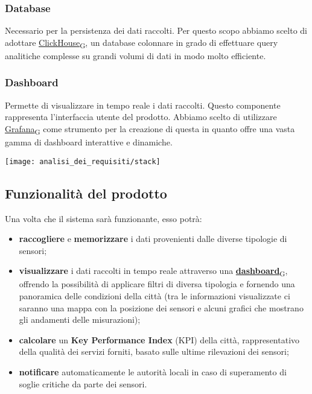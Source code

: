 	\subsubsection*{Database}
	Necessario per la persistenza dei dati raccolti. Per questo scopo abbiamo scelto di adottare \href{https://7last.github.io/docs/rtb/documentazione-interna/glossario\#clickhouse}{ClickHouse\textsubscript{G}}, un database colonnare in grado di effettuare query analitiche complesse su grandi volumi di dati in modo molto efficiente.
	\subsubsection*{Dashboard}
	Permette di visualizzare in tempo reale i dati raccolti. Questo componente rappresenta l'interfaccia utente del prodotto. Abbiamo scelto di utilizzare \href{https://7last.github.io/docs/rtb/documentazione-interna/glossario\#grafana}{Grafana\textsubscript{G}} come strumento per la creazione di questa in quanto offre una vasta gamma di dashboard interattive e dinamiche.


\begin{center}
	\texttt{[image: analisi\_dei\_requisiti/stack]}
\end{center}

\subsection{Funzionalità del prodotto}
Una volta che il sistema sarà funzionante, esso potrà:
\begin{itemize}
	\item \textbf{raccogliere} e \textbf{memorizzare} i dati provenienti dalle diverse tipologie di sensori;
	\item \textbf{visualizzare} i dati raccolti in tempo reale attraverso una \href{https://7last.github.io/docs/rtb/documentazione-interna/glossario\#dashboard}{\textbf{dashboard}\textsubscript{G}}, offrendo la possibilità di applicare filtri di diversa tipologia e fornendo una panoramica delle condizioni della città (tra le informazioni visualizzate ci saranno una mappa con la posizione dei sensori e alcuni grafici che mostrano gli andamenti delle misurazioni);
	\item \textbf{calcolare} un \textbf{Key Performance Index} (KPI) della città, rappresentativo della qualità dei servizi forniti, basato sulle ultime rilevazioni dei sensori;
	\item \textbf{notificare} automaticamente le autorità locali in caso di superamento di soglie critiche da parte dei sensori.
\end{itemize}
\newpage
